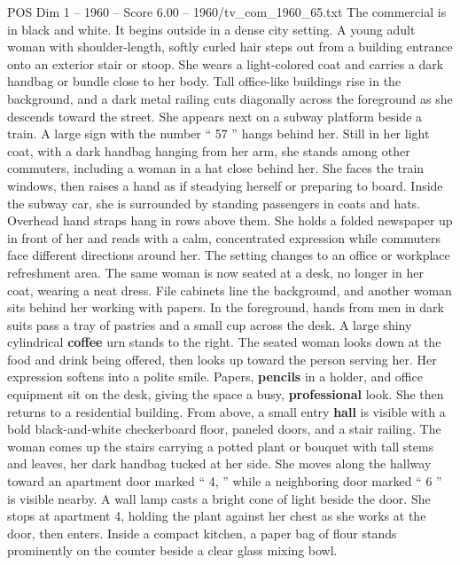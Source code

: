 \begin{textsample}{POS Dim 1 – 1960 – Score 6.00 – 1960/tv\_com\_1960\_65.txt}  \label{ex:f1_pos_072}
The commercial is in black and white.
It begins outside in a dense city setting.
A young adult woman with shoulder-length, softly curled hair steps out from a building entrance onto an exterior stair or stoop.
She wears a light-colored coat and carries a dark handbag or bundle close to her body.
Tall office-like buildings rise in the background, and a dark metal railing cuts diagonally across the foreground as she descends toward the street.
She appears next on a subway platform beside a train.
A large sign with the number “ 57 ” hangs behind her.
Still in her light coat, with a dark handbag hanging from her arm, she stands among other commuters, including a woman in a hat close behind her.
She faces the train windows, then raises a hand as if steadying herself or preparing to board.
Inside the subway car, she is surrounded by standing passengers in coats and hats.
Overhead hand straps hang in rows above them.
She holds a folded newspaper up in front of her and reads with a calm, concentrated expression while commuters face different directions around her.
The setting changes to an office or workplace refreshment area.
The same woman is now seated at a desk, no longer in her coat, wearing a neat dress.
File cabinets line the background, and another woman sits behind her working with papers.
In the foreground, hands from men in dark suits pass a tray of pastries and a small cup across the desk.
A large shiny cylindrical \textbf{coffee} urn stands to the right.
The seated woman looks down at the food and drink being offered, then looks up toward the person serving her.
Her expression softens into a polite smile.
Papers, \textbf{pencils} in a holder, and office equipment sit on the desk, giving the space a busy, \textbf{professional} look.
She then returns to a residential building.
From above, a small entry \textbf{hall} is visible with a bold black-and-white checkerboard floor, paneled doors, and a stair railing.
The woman comes up the stairs carrying a potted plant or bouquet with tall stems and leaves, her dark handbag tucked at her side.
She moves along the hallway toward an apartment door marked “ 4, ” while a neighboring door marked “ 6 ” is visible nearby.
A wall lamp casts a bright cone of light beside the door.
She stops at apartment 4, holding the plant against her chest as she works at the door, then enters.
Inside a compact kitchen, a paper bag of flour stands prominently on the counter beside a clear glass mixing bowl.

\end{textsample}
